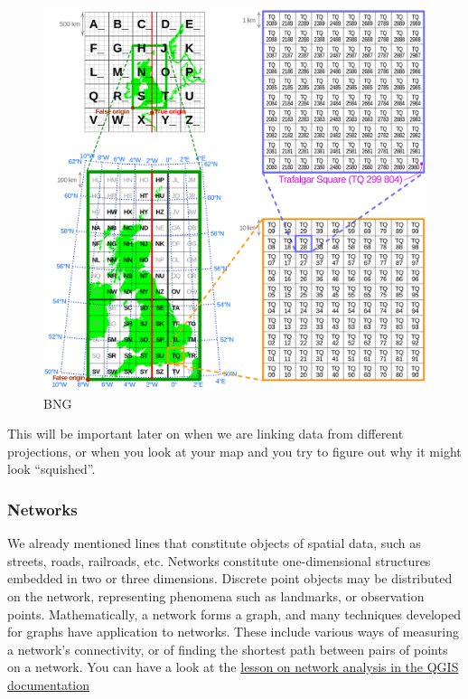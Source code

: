 \documentclass[]{book}
\begin{document}
\begin{figure}
\centering
\includegraphics{img/Ordnance_Survey_National_Grid.svg.png}
\caption{BNG}
\end{figure}

This will be important later on when we are linking data from different projections, or when you look at your map and you try to figure out why it might look ``squished''.

\hypertarget{networks}{%
\subsubsection{Networks}\label{networks}}

We already mentioned lines that constitute objects of spatial data, such as streets, roads, railroads, etc. Networks constitute one-dimensional structures embedded in two or three dimensions. Discrete point objects may be distributed on the network, representing phenomena such as landmarks, or observation points. Mathematically, a network forms a graph, and many techniques developed for graphs have application to networks. These include various ways of measuring a network's connectivity, or of finding the shortest path between pairs of points on a network. You can have a look at the \href{https://docs.qgis.org/2.18/en/docs/training_manual/vector_analysis/network_analysis.html}{lesson on network analysis in the QGIS documentation}
\end{document}
